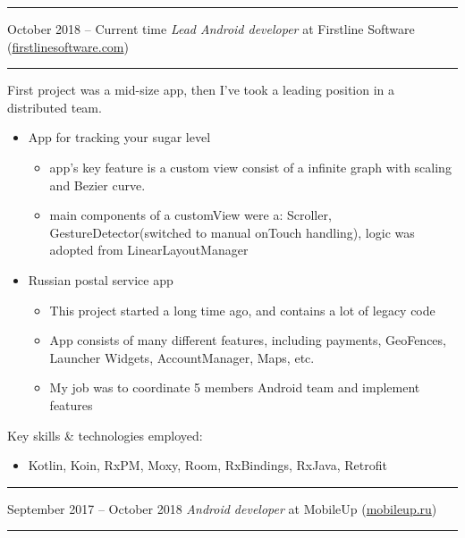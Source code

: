 \documentclass[11pt]{article}
\newcommand\CvSmallSkipLength{0.5em}
\newcommand\CvSkip[1]{\vspace{#1}}
\newcommand\CvSmallSkip{\CvSkip{\CvSmallSkipLength}}
\newcommand\CvRule{\begingroup\color{CvRuleColor}\hrule\endgroup}
\newcommand\CvWorkplaceHeader[5]{\begingroup%
  \CvRule%
  \fboxsep0pt%
  \colorbox{CvWorkplaceHeaderColor}{%
    \begin{minipage}{\linewidth-2\fboxsep}%
\CvSmallSkip%
#1 -- #2 \hfill \textit{#3} at #4 (\href{http://#5/}{#5})%
\CvSmallSkip%
    \end{minipage}%
  }%
  \CvRule%
\endgroup%
}
\newenvironment{CvWorkplaceDescription}{%
    \begingroup\setlength\parskip{\CvSmallSkipLength}%
  }{%
    \CvSmallSkip\endgroup%
  }
\begin{document}
\CvWorkplaceHeader{October 2018}{Current time}{Lead Android developer}{Firstline Software}{firstlinesoftware.com}
\begin{CvWorkplaceDescription}
First project	 was a mid-size app, then I've took a leading position in a distributed team.
\begin{itemize}[noitemsep]
 \item App for tracking your sugar level
\begin{itemize}
\item  app's key feature is a custom view consist of a infinite graph with scaling and Bezier curve. 
 \item main components of a customView were a: Scroller, GestureDetector(switched to manual onTouch handling), logic was adopted from LinearLayoutManager
\end{itemize}
\item Russian postal service app
\begin{itemize}
\item  This project started a long time ago, and contains a lot of legacy code
\item  App consists of many different features, including payments, GeoFences, Launcher Widgets, AccountManager, Maps, etc.
 \item My job was to coordinate 5 members Android team and implement features
\end{itemize}
\end{itemize}

Key skills \& technologies employed:
\begin{itemize}[noitemsep]
  \item Kotlin, Koin, RxPM, Moxy, Room, RxBindings, RxJava, Retrofit
\end{itemize}
\end{CvWorkplaceDescription}

\CvWorkplaceHeader{September 2017}{October 2018}{Android developer}{MobileUp}{mobileup.ru}
\end{document}
